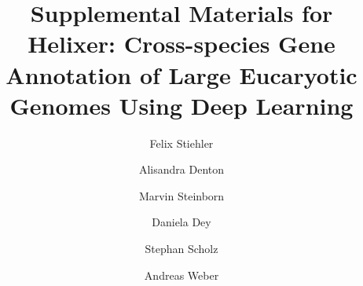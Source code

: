 \documentclass{article}
\begin{document}
\title{Supplemental Materials for \\ Helixer: Cross-species Gene Annotation of Large Eucaryotic Genomes Using Deep Learning}

\author[1]{Felix Stiehler}
\author[1]{Alisandra Denton}
\author[1]{Marvin Steinborn}
\author[ \hspace{-1ex}]{Daniela Dey}
\author[ \hspace{-1ex}]{Stephan Scholz}
\author[1]{Andreas Weber}


\date{}
\maketitle
\tableofcontents

\newpage
\end{document}
